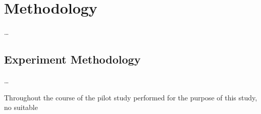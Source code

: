 
\chapter{Methodology}
\label{cha:methodology}
\ldots

\section{Experiment Methodology}
\label{sec:methodology_experimentmethodology}
\ldots

Throughout the course of the pilot study performed for the purpose of this study, no suitable \dvttermopengles




